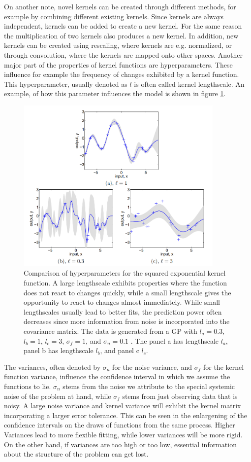 \newline \newline
On another note, novel kernels can be created through different methods, for example by combining different existing kernels. Since kernels are always independent, kernels can be added to create a new kernel. For the same reason the multiplication of two kernels also produces a new kernel. In addition, new kernels can be created using rescaling, where kernels are e.g. normalized, or through convolution, where the kernels are mapped onto other spaces. Another major part of the properties of kernel functions are hyperparameters. These influence for example the frequency of changes exhibited by a kernel function. This hyperparameter, usually denoted as $l$ is often called kernel lengthscale. An example, of how this parameter influences the model is shown in figure \ref{fig:lengthscale}.
\begin{figure}%
	\label{fig:lengthscale}
	\centering
	\includegraphics[width=4in]{img/05_4/lengthscale.png}
	\caption[Lengthscale influence on samples]
	{Comparison of hyperparameters for the squared exponential kernel function. A large lengthscale exhibits properties where the function does not react to changes quickly, while a small lengthscale gives the opportunity to react to changes almost immediately. While small lengthscales usually lead to better fits, the prediction power often decreases since more information from noise is incorporated into the covariance matrix. The data is generated from a GP with $l_a=0.3$, $l_b=1$, $l_c=3$, $\sigma_f=1$, and $\sigma_n=0.1$ \cite{Rasmussen_06}. The panel a has lengthscale $l_a$, panel b has lengthscale $l_b$, and panel c $l_c$.}
\end{figure}
The variances, often denoted by $\sigma_n$ for the noise variance, and $\sigma_f$ for the kernel function variance, influence the confidence interval in which we assume the functions to lie. $\sigma_n$ stems from the noise we attribute to the special systemic noise of the problem at hand, while $\sigma_f$ stems from just observing data that is noisy. A large noise variance and kernel variance will exhibit the kernel matrix incorporating a larger error tolerance. This can be seen in the enlargening of the confidence intervals on the draws of functions from the same process. Higher Variances lead to more flexible fitting, while lower variances will be more rigid. On the other hand, if variances are too high or too low, essential information about the structure of the problem can get lost.